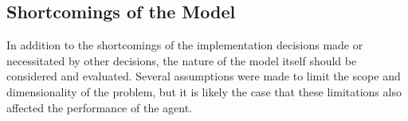 
\subsection{Shortcomings of the Model}
\label{sec:disc-shortcomings}

In addition to the shortcomings of the implementation decisions made or
necessitated by other decisions,
the nature of the model itself should be considered and evaluated.
%
Several assumptions were made to limit the scope and dimensionality of the
problem,
but it is likely the case that these limitations also affected the
performance of the agent.





%



